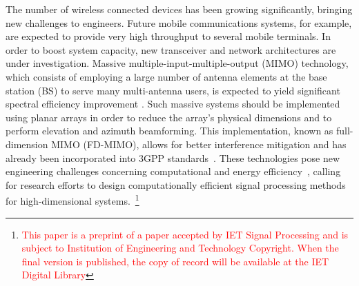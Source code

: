 \documentclass{cta-author}
\begin{document}
The number of wireless connected devices has been growing significantly, bringing new challenges to engineers. Future mobile communications systems, for example, are expected to provide very high throughput to several mobile terminals. In order to boost system capacity, new transceiver and network architectures are under investigation. Massive multiple-input-multiple-output (MIMO) technology, which consists of employing a large number of antenna elements at the base station (BS) to serve many multi-antenna users, is expected to yield significant spectral efficiency improvement \cite{larsson_massive_2014,schwarz_society_2016}. Such massive systems should be implemented using planar arrays in order to reduce the array's physical dimensions and to perform elevation and azimuth beamforming. This implementation, known as full-dimension MIMO (FD-MIMO), allows for better interference mitigation and has already been incorporated into 3GPP standards~\cite{ji_overview_2017}. These technologies pose new engineering challenges concerning computational and energy efficiency~\cite{ribeiro2018energy}, calling for research efforts to design computationally efficient signal processing methods for high-dimensional systems.~\footnote{\textcolor{red}{This paper is a preprint of a paper accepted by IET Signal Processing and is subject to Institution of Engineering and Technology Copyright. When the final version is published, the copy of record will be available at the IET Digital Library}} 
\end{document}

